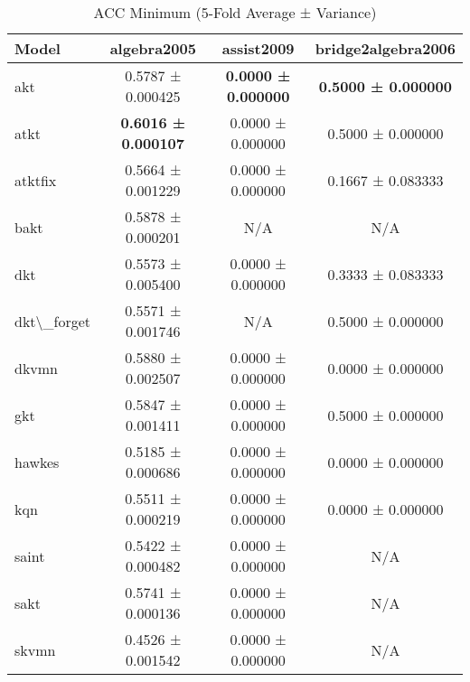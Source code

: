 \begin{table}[H]
\centering
\caption{ACC Minimum (5-Fold Average ± Variance)}
\label{tab:acc_min}
\begin{tabular}{lccc}
\toprule
Model & algebra2005 & assist2009 & bridge2algebra2006 \\
\midrule
akt & 0.5787 ± 0.000425 & \textbf{0.0000 ± 0.000000} & \textbf{0.5000 ± 0.000000} \\
atkt & \textbf{0.6016 ± 0.000107} & 0.0000 ± 0.000000 & 0.5000 ± 0.000000 \\
atktfix & 0.5664 ± 0.001229 & 0.0000 ± 0.000000 & 0.1667 ± 0.083333 \\
bakt & 0.5878 ± 0.000201 & N/A & N/A \\
dkt & 0.5573 ± 0.005400 & 0.0000 ± 0.000000 & 0.3333 ± 0.083333 \\
dkt\textbackslash{}_forget & 0.5571 ± 0.001746 & N/A & 0.5000 ± 0.000000 \\
dkvmn & 0.5880 ± 0.002507 & 0.0000 ± 0.000000 & 0.0000 ± 0.000000 \\
gkt & 0.5847 ± 0.001411 & 0.0000 ± 0.000000 & 0.5000 ± 0.000000 \\
hawkes & 0.5185 ± 0.000686 & 0.0000 ± 0.000000 & 0.0000 ± 0.000000 \\
kqn & 0.5511 ± 0.000219 & 0.0000 ± 0.000000 & 0.0000 ± 0.000000 \\
saint & 0.5422 ± 0.000482 & 0.0000 ± 0.000000 & N/A \\
sakt & 0.5741 ± 0.000136 & 0.0000 ± 0.000000 & N/A \\
skvmn & 0.4526 ± 0.001542 & 0.0000 ± 0.000000 & N/A \\
\bottomrule
\end{tabular}
\end{table}
